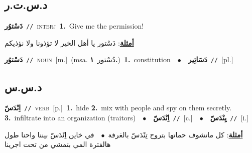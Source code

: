 \documentclass[10pt,a4paper,twoside]{article} %
\begin{document}
\begin{multicols}{2}
\vspace{-3mm}
\subsection*{\color{blue}\foreignlanguage{arabic}{د.س.ت.ر}\color{blue}{}} 

{\setlength\topsep{0pt}\textbf{\foreignlanguage{arabic}{دَسْتوُر}}\ {\color{gray}\texttt{//}\color{black}}\ \textsc{interj}\ \textbf{1.}~Give me the permission!\  \begin{flushright}\color{gray}\foreignlanguage{arabic}{\textbf{\underline{\foreignlanguage{arabic}{أمثلة}}}: دَسْتور يا أهل الخير لا تؤذونا ولا نؤذيكم}\end{flushright}\color{black}} \vspace{2mm}

{\setlength\topsep{0pt}\textbf{\foreignlanguage{arabic}{دَسْتوُر}}\ {\color{gray}\texttt{//}\color{black}}\ \textsc{noun}\ [m.]\ \color{gray}(msa. \foreignlanguage{arabic}{دُسْتور}~\foreignlanguage{arabic}{\textbf{١.}})\color{black}\ \textbf{1.}~constitution\ \ $\bullet$\ \ \setlength\topsep{0pt}\textbf{\foreignlanguage{arabic}{دَسَاتِير}}\ {\color{gray}\texttt{//}\color{black}}\ [pl.]\ } \vspace{2mm}

\vspace{-3mm}
\subsection*{\color{blue}\foreignlanguage{arabic}{د.س.س}\color{blue}{}} 

{\setlength\topsep{0pt}\textbf{\foreignlanguage{arabic}{اِنْدَسّ}}\ {\color{gray}\texttt{//}\color{black}}\ \textsc{verb}\ [p.]\ \textbf{1.}~hide  \textbf{2.}~mix with people and spy on them secretly.  \textbf{3.}~infiltrate into an organization (traitors)\ \ $\bullet$\ \ \setlength\topsep{0pt}\textbf{\foreignlanguage{arabic}{اِنْدَسّ}}\ {\color{gray}\texttt{//}\color{black}}\ [c.]\ \ $\bullet$\ \ \setlength\topsep{0pt}\textbf{\foreignlanguage{arabic}{يِنْدَسّ}}\ {\color{gray}\texttt{//}\color{black}}\ [i.]\  \begin{flushright}\color{gray}\foreignlanguage{arabic}{\textbf{\underline{\foreignlanguage{arabic}{أمثلة}}}: كل ماتشوف حماتها بتروح تِنْدَسّ بالغرفة\ $\bullet$\ \  في خاين اِنْدَسّ بيننا واحنا طول هالفترة المي بتمشي من تحت اجرينا}\end{flushright}\color{black}} \vspace{2mm}


\end{multicols}
\end{document}
